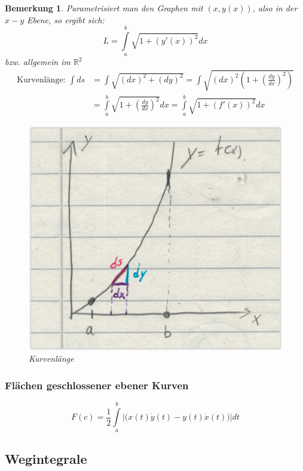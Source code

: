 \documentclass[12pt,a4paper]{report}%
\newtheorem{bem}{Bemerkung}[section]
\numberwithin{equation}{section}
\newcommand{\R}{\mathbb{R}} %
\numberwithin{equation}{subsection}
\begin{document}
	  \begin{bem}
	    Parametrisiert man den Graphen mit $(x, y(x))$, also in der $x-y$ Ebene, so ergibt sich:
	    \begin{equation}
	      L = \int\limits_a^b \sqrt{1 + (y'(x))^2}dx
	    \end{equation}
	    bzw. allgemein im $\R^2$
	    \begin{align*}
	      \text{Kurvenlänge: } \int ds &= \int \sqrt{(dx)^2 + (dy)^2} = \int \sqrt{(dx)^2 \left( 1 + \left(\frac{dy}{dx}\right)^2\right)} \\
	      &= \int\limits_a^b \sqrt{1 + \left(\frac{dy}{dx}\right)^2 }dx = \int\limits_a^b \sqrt{1 + (f'(x))^2}dx
	    \end{align*}
	    \begin{figure}[H] 
				\centering
			  \includegraphics[width=0.4\linewidth]{kurvenlaenge.png}
			  \caption{Kurvenlänge}
			  \label{fig:lkurvenlaenge}
      \end{figure}
	  \end{bem}
	  
	  \subsubsection{Flächen geschlossener ebener Kurven}
	  \begin{equation}
	    F(c) = \frac{1}{2} \int\limits_a^b \big|\big(x(t)\dot{y}(t) - y(t)\dot{x}(t)\big)\big|dt
	  \end{equation}
  \subsection{Wegintegrale}
\end{document}
